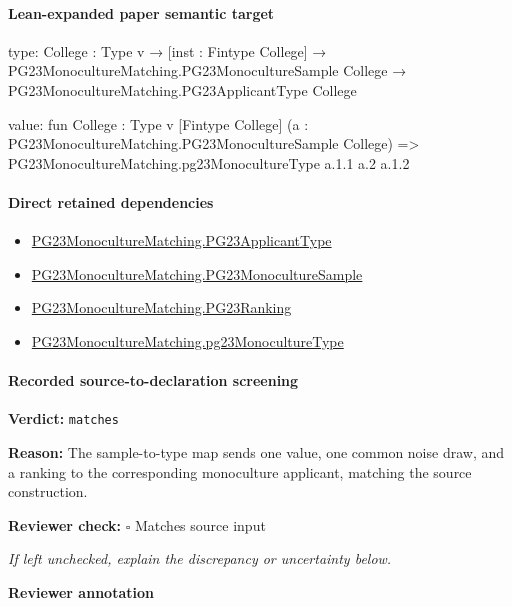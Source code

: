 \documentclass[10pt]{article}
\newcommand{\reviewerbox}{%
  \par\noindent\fbox{\parbox{0.96\linewidth}{\rule{0pt}{0.38in}}}\par
}
\newcommand{\reviewmatch}[1]{%
  \par\noindent\textbf{Reviewer check:} $\square$\; #1\par
  \noindent\emph{If left unchecked, explain the discrepancy or uncertainty below.}\par
}
\begin{document}
\paragraph{Lean-expanded paper semantic target}
\begin{ReviewVerbatim}
type:
{College : Type v} →
  [inst : Fintype College] →
    PG23MonocultureMatching.PG23MonocultureSample College → PG23MonocultureMatching.PG23ApplicantType College

value:
fun {College : Type v} [Fintype College] (a : PG23MonocultureMatching.PG23MonocultureSample College) =>
  PG23MonocultureMatching.pg23MonocultureType a.1.1 a.2 a.1.2
\end{ReviewVerbatim}

\paragraph{Direct retained dependencies}
\begin{itemize}\raggedright
\item \hyperlink{paper-prerequisite-40ad59c353cf95ec}{PG23\allowbreak{}Monoculture\allowbreak{}Matching.\allowbreak{}PG23\allowbreak{}Applicant\allowbreak{}Type}
\item \hyperlink{governing-declaration-f25f7668232f8d8d}{PG23\allowbreak{}Monoculture\allowbreak{}Matching.\allowbreak{}PG23\allowbreak{}Monoculture\allowbreak{}Sample}
\item \hyperlink{paper-prerequisite-8769258a80216d15}{PG23\allowbreak{}Monoculture\allowbreak{}Matching.\allowbreak{}PG23\allowbreak{}Ranking}
\item \hyperlink{paper-prerequisite-b9706024b8c86426}{PG23\allowbreak{}Monoculture\allowbreak{}Matching.\allowbreak{}pg23\allowbreak{}Monoculture\allowbreak{}Type}
\end{itemize}
\paragraph{Recorded source-to-declaration screening}
\textbf{Verdict:} \texttt{matches}
\\
{\raggedright
\textbf{Reason:} The sample-\allowbreak{}to-\allowbreak{}type map sends one value, one common noise draw, and a ranking to the corresponding monoculture applicant, matching the source construction.\allowbreak{}
\par}
\reviewmatch{Matches source input}
\noindent\textbf{Reviewer annotation}\par
\reviewerbox
\clearpage
\hypertarget{paper-prerequisite-b9080a6bda2a8422}{}
\end{document}
